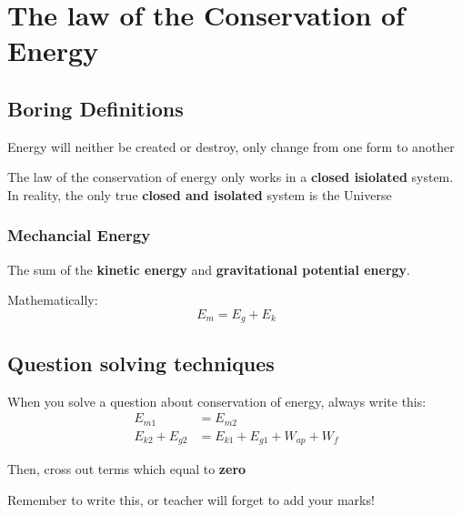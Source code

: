 \newpage
\section{The law of the Conservation of Energy}
\subsection{Boring Definitions}
\begin{definition}
     Energy will neither be created or destroy, only change from one form to another
\end{definition}

\begin{remark}
    The law of the conservation of energy only works in a \textbf{closed isiolated} system. In reality, the only true \textbf{closed and isolated} system is the Universe
\end{remark}

\subsubsection*{Mechancial Energy}
\begin{definition}
      The sum of the \textbf{kinetic energy} and \textbf{gravitational potential energy}.
\end{definition}

Mathematically:
\begin{equation}
    E_m = E_g + E_k
\end{equation}

\subsection{Question solving techniques}
When you solve a question about conservation of energy, always write this:
\begin{align*}
    E_{m1} &= E_{m2}\\
    E_{k2} + E_{g2} &= E_{k1} + E_{g1} + W_{ap} + W_{f}
\end{align*}

Then, cross out terms which equal to \textbf{zero}

\begin{remark}
    Remember to write this, or teacher will forget to add your marks!
\end{remark}
